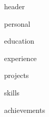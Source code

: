 {{header}}

    
\vspace*{-40pt}

    

{{personal}}

{{education}}

{{experience}}

{{projects}}

{{skills}}

\vspace{2mm}
\vspace{1mm}

{{achievements}}

